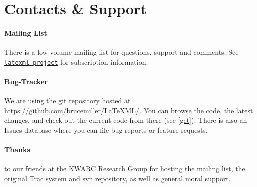 \documentclass{article}
\begin{document}

\section{Contacts \& Support}\label{contact}

\paragraph{Mailing List}\label{contact.list}
There is a low-volume mailing list for questions, support and comments.
See \href{http://lists.jacobs-university.de/mailman/listinfo/project-latexml}{\texttt{latexml-project}} for subscription information.


\paragraph{Bug-Tracker}\label{contact.git}
We are using the git repository hosted at
\href{https://github.com/brucemiller/LaTeXML/}{https://github.com/brucemiller/LaTeXML/}.
You can browse the code, the latest changes, and check-out the current code from
there (see \ref{get}).  There is also an Issues database where you can
file bug reports or feature requests.



\paragraph{Thanks} to our friends at
the \href{http://kwarc.info}{KWARC Research Group}
for hosting the mailing list, the original Trac system and svn repository,
as well as general moral support.
\end{document}
